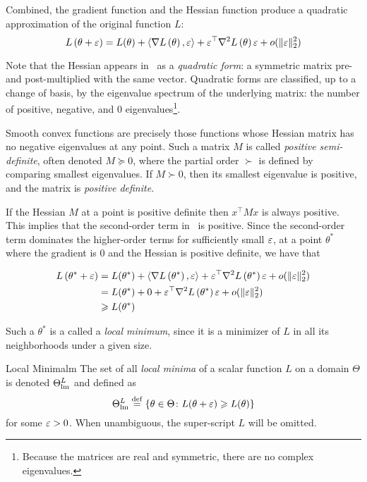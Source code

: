 \documentclass[../../thesis.tex]{subfiles}
\begin{document}
Combined, the gradient function and the Hessian function produce a quadratic approximation
of the original function $L$:
\begin{equation}
	L\left(\theta + \eps\right) =
	L(\theta)
	+ \langle\grad{L}{\theta},\eps\rangle
	+ \eps^\top\hess{L}{\theta}\eps + o(\snormt{\eps})\equationlabel{taylor-two}
\end{equation}

Note that the Hessian appears in~
as a \emph{quadratic form}:
a symmetric matrix pre- and post-multiplied with the same vector.
Quadratic forms are classified,
up to a change of basis, by the eigenvalue spectrum
of the underlying matrix:
the number of positive, negative, and 0 eigenvalues\footnote{%
Because the matrices are real and symmetric,
there are no complex eigenvalues.}.

Smooth convex functions are precisely those functions whose
Hessian matrix has no negative eigenvalues at any
point.
Such a matrix $M$ is called \emph{positive semi-definite},
often denoted $M \succeq 0$,
where the partial order $\succ$ is defined by
comparing smallest eigenvalues.
If $M \succ 0$, then its smallest eigenvalue is positive,
and the matrix is \emph{positive definite}.

If the Hessian $M$ at a point is positive definite
then $x^\top M x$ is always positive.
This implies that the second-order term in~
is positive.
Since the second-order term dominates the higher-order terms
for sufficiently small $\varepsilon$,
at a point $\theta^*$ where the gradient is $0$
and the Hessian is positive definite,
we have that

\begin{align}
	L\left(\theta^* + \varepsilon\right) &=
	L(\theta^*)
	+ \langle\nabla L\left(\theta^*\right),\varepsilon\rangle
	+ \varepsilon^\top\nabla^2L\left(\theta^*\right)\varepsilon + o(\lVert\varepsilon\rVert_{\scriptstyle2}^2)\\
	&=
	L(\theta^*)
	+ 0
	+ \varepsilon^\top\nabla^2L\left(\theta^*\right)\varepsilon + o(\lVert\varepsilon\rVert_{\scriptstyle2}^2)\\
	&\geqslant
	L(\theta^*)
\end{align}

Such a $\theta^*$ is a called a \emph{local minimum},
since it is a minimizer of $L$ in all its neighborhoods
under a given size.
\begin{definition}{Local Minima}{lm}
	The set of all \emph{local minima} of a scalar function $L$
	on a domain $\Theta$ is denoted $\Theta^L_{\mathrm{lm}}$ and defined as
	\begin{equation}\equationlabel{def-thetalm}
		\Theta^L_{\lm} \defeq
		\Set{\theta \in \Theta \suchthat L(\theta + \eps) \geq L(\theta)}
	\end{equation}
	for some $\varepsilon > 0$.
	When unambiguous, the super-script $L$ will be omitted.
\end{definition}
\end{document}
